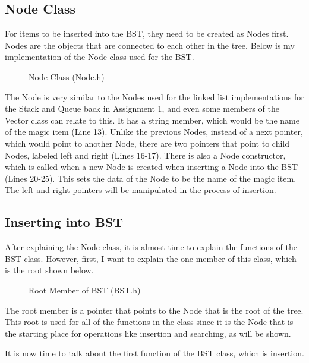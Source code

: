 \documentclass[letterpaper, 10pt]{article}
\begin{document}
\subsection{Node Class}
\noindent
For items to be inserted into the BST, they need to be created as Nodes first. Nodes are the objects that are connected to each other in the tree. Below is my implementation of the Node class used for the BST.

\begin{figure}[H]
  \centering
   
  \caption{Node Class (Node.h)}
  \label{fig:figure3.4}
\end{figure}

\noindent
The Node is very similar to the Nodes used for the linked list implementations for the Stack and Queue back in Assignment 1, and even some members of the Vector class can relate to this. It has a string member, which would be the name of the magic item (Line 13). Unlike the previous Nodes, instead of a next pointer, which would point to another Node, there are two pointers that point to child Nodes, labeled left and right (Lines 16-17). There is also a Node constructor, which is called when a new Node is created when inserting a Node into the BST (Lines 20-25). This sets the data of the Node to be the name of the magic item. The left and right pointers will be manipulated in the process of insertion.   

\subsection{Inserting into BST}
\noindent
After explaining the Node class, it is almost time to explain the functions of the BST class. However, first, I want to explain the one member of this class, which is the root shown below.

\begin{figure}[H]
  \centering
   
  \caption{Root Member of BST (BST.h)}
  \label{fig:figure3.5}
\end{figure}

\vspace{-0.5em}
\noindent
The root member is a pointer that points to the Node that is the root of the tree. This root is used for all of the functions in the class since it is the Node that is the starting place for operations like insertion and searching, as will be shown.

\vspace{0.5em}
\noindent
It is now time to talk about the first function of the BST class, which is insertion.
\end{document}
